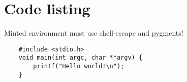 \section{Code listing}

Minted environment must use shell-escape and pygments!

\begin{verbatim}
    #include <stdio.h>
    void main(int argc, char **argv) {
        printf("Hello world!\n");
    }
\end{verbatim}